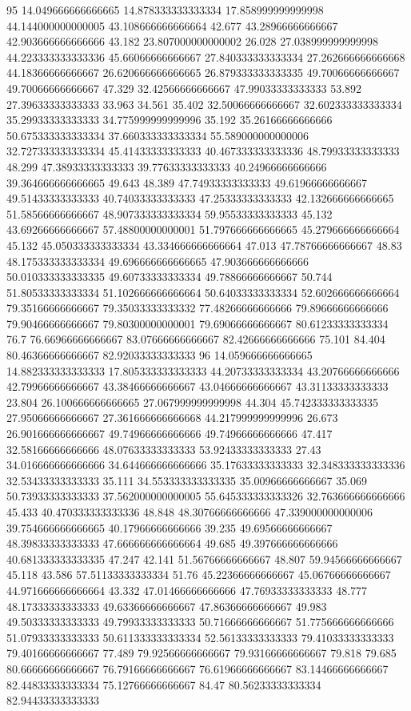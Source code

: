 95 14.049666666666665 14.878333333333334 17.858999999999998 44.144000000000005 43.108666666666664 42.677 43.28966666666667 42.903666666666666 43.182 23.807000000000002 26.028 27.038999999999998 44.223333333333336 45.66066666666667 27.840333333333334 27.262666666666668 44.18366666666667 26.620666666666665 26.879333333333335 49.70066666666667 49.70066666666667 47.329 32.42566666666667 47.99033333333333 53.892 27.39633333333333 33.963 34.561 35.402 32.50066666666667 32.602333333333334 35.29933333333333 34.775999999999996 35.192 35.26166666666666 50.675333333333334 37.660333333333334 55.589000000000006 32.727333333333334 45.41433333333333 40.467333333333336 48.79933333333333 48.299 47.38933333333333 39.77633333333333 40.24966666666666 39.364666666666665 49.643 48.389 47.74933333333333 49.61966666666667 49.51433333333333 40.74033333333333 47.25333333333333 42.132666666666665 51.58566666666667 48.907333333333334 59.95533333333333 45.132 43.69266666666667 57.48800000000001 51.797666666666665 45.279666666666664 45.132 45.050333333333334 43.334666666666664 47.013 47.78766666666667 48.83 48.175333333333334 49.696666666666665 47.903666666666666 50.010333333333335 49.60733333333334 49.78866666666667 50.744 51.80533333333334 51.102666666666664 50.64033333333334 52.602666666666664 79.35166666666667 79.35033333333332 77.48266666666666 79.89666666666666 79.90466666666667 79.80300000000001 79.69066666666667 80.61233333333334 76.7 76.66966666666667 83.07666666666667 82.42666666666666 75.101 84.404 80.46366666666667 82.92033333333333
96 14.059666666666665 14.882333333333333 17.805333333333333 44.20733333333334 43.20766666666666 42.79966666666667 43.38466666666667 43.04666666666667 43.31133333333333 23.804 26.100666666666665 27.067999999999998 44.304 45.742333333333335 27.95066666666667 27.361666666666668 44.217999999999996 26.673 26.901666666666667 49.74966666666666 49.74966666666666 47.417 32.58166666666666 48.07633333333333 53.92433333333333 27.43 34.016666666666666 34.644666666666666 35.17633333333333 32.348333333333336 32.53433333333333 35.111 34.553333333333335 35.00966666666667 35.069 50.73933333333333 37.562000000000005 55.645333333333326 32.763666666666666 45.433 40.470333333333336 48.848 48.30766666666666 47.339000000000006 39.754666666666665 40.17966666666666 39.235 49.69566666666667 48.39833333333333 47.666666666666664 49.685 49.397666666666666 40.681333333333335 47.247 42.141 51.56766666666667 48.807 59.94566666666667 45.118 43.586 57.51133333333334 51.76 45.22366666666667 45.06766666666667 44.971666666666664 43.332 47.01466666666666 47.76933333333333 48.777 48.17333333333333 49.63366666666667 47.86366666666667 49.983 49.50333333333333 49.79933333333333 50.71666666666667 51.775666666666666 51.07933333333333 50.611333333333334 52.56133333333333 79.41033333333333 79.40166666666667 77.489 79.92566666666667 79.93166666666667 79.818 79.685 80.66666666666667 76.79166666666667 76.61966666666667 83.14466666666667 82.44833333333334 75.12766666666667 84.47 80.56233333333334 82.94433333333333
